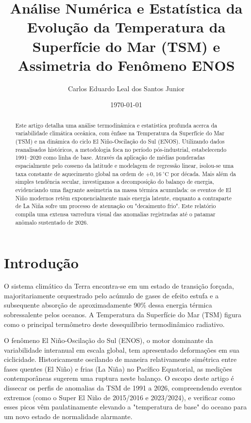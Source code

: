 \documentclass[11pt,a4paper]{article}
\begin{document}
\title{\textbf{Análise Numérica e Estatística da Evolução da Temperatura da Superfície do Mar (TSM) e Assimetria do Fenômeno ENOS}}
\author{Carlos Eduardo Leal dos Santos Junior}
\date{\today}

\maketitle

\begin{abstract}
Este artigo detalha uma análise termodinâmica e estatística profunda acerca da variabilidade climática oceânica, com ênfase na Temperatura da Superfície do Mar (TSM) e na dinâmica do ciclo El Niño-Oscilação do Sul (ENOS). Utilizando dados reanalisados históricos, a metodologia foca no período pós-industrial, estabelecendo 1991--2020 como linha de base. Através da aplicação de médias ponderadas espacialmente pelo cosseno da latitude e modelagem de regressão linear, isolou-se uma taxa constante de aquecimento global na ordem de $+0,16\ ^\circ\text{C}$ por década. Mais além da simples tendência secular, investigamos a decomposição do balanço de energia, evidenciando uma flagrante assimetria na massa térmica acumulada: os eventos de El Niño modernos retêm exponencialmente mais energia latente, enquanto a contraparte de La Niña sofre um processo de atenuação ou "decaimento frio". Este relatório compila uma extensa varredura visual das anomalias registradas até o patamar anômalo sustentado de 2026.
\end{abstract}

\section{Introdução}
O sistema climático da Terra encontra-se em um estado de transição forçada, majoritariamente orquestrado pelo acúmulo de gases de efeito estufa e a subsequente absorção de aproximadamente 90\% dessa energia térmica sobressalente pelos oceanos. A Temperatura da Superfície do Mar (TSM) figura como o principal termômetro deste desequilíbrio termodinâmico radiativo.

O fenômeno El Niño-Oscilação do Sul (ENOS), o motor dominante da variabilidade interanual em escala global, tem apresentado deformações em sua ciclicidade. Historicamente oscilando de maneira relativamente simétrica entre fases quentes (El Niño) e frias (La Niña) no Pacífico Equatorial, as medições contemporâneas sugerem uma ruptura neste balanço. O escopo deste artigo é dissecar os perfis de anomalias da TSM de 1991 a 2026, compreendendo eventos extremos (como o Super El Niño de 2015/2016 e 2023/2024), e verificar como esses picos vêm paulatinamente elevando a "temperatura de base" do oceano para um novo estado de normalidade alarmante.
\end{document}
